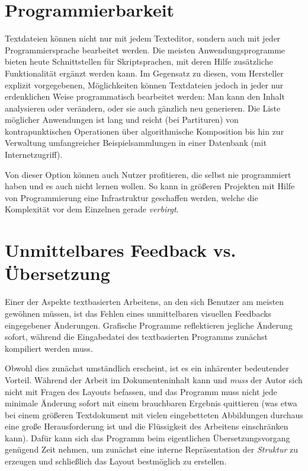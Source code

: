 \documentclass[DIV=12]{scrreprt}
\begin{document}
\section*{Programmierbarkeit}
\label{sec:pt_programmability}
Textdateien können nicht nur mit jedem Texteditor, sondern auch mit jeder Programmiersprache bearbeitet werden.
Die meisten Anwendungsprogramme bieten heute Schnittstellen für Skriptsprachen, mit deren Hilfe zusätzliche Funktionalität ergänzt werden kann.
Im Gegensatz zu diesen, vom Hersteller explizit vorgegebenen, Möglichkeiten können Textdateien jedoch in jeder nur erdenklichen Weise programmatisch bearbeitet werden: Man kann den Inhalt analysieren oder verändern, oder sie auch gänzlich neu generieren.
Die Liste möglicher Anwendungen ist lang und reicht (bei Partituren) von kontrapunktischen Operationen über algorithmische Komposition bis hin zur Verwaltung umfangreicher Beispielsammlungen in einer Datenbank (mit Internetzugriff).

Von dieser Option können auch Nutzer profitieren, die selbst nie programmiert haben und es auch nicht lernen wollen.
So kann in größeren Projekten mit Hilfe von Programmierung eine Infrastruktur geschaffen werden, welche die Komplexität vor dem Einzelnen gerade \emph{verbirgt}.

\section*{Unmittelbares Feedback vs. Übersetzung}
\label{sec:pt_compiling-instant}
Einer der Aspekte textbasierten Arbeitens, an den sich Benutzer am meisten gewöhnen müssen, ist das Fehlen eines unmittelbaren visuellen Feedbacks eingegebener Änderungen.
Grafische Programme reflektieren jegliche Änderung sofort, während die Eingabedatei des textbasierten Programms zunächst kompiliert werden muss.

Obwohl dies zunächst umständlich erscheint, ist es ein inhärenter bedeutender Vorteil.
Während der Arbeit im Dokumenteninhalt kann und \emph{muss} der Autor sich nicht mit Fragen des Layouts befassen, und das Programm muss nicht jede minimale Änderung sofort mit einem brauchbaren Ergebnis quittieren (was etwa bei einem größeren Textdokument mit vielen eingebetteten Abbildungen durchaus eine große Herausforderung ist und die Flüssigkeit des Arbeitens einschränken kann).
Dafür kann sich das Programm beim eigentlichen Übersetzungsvorgang genügend Zeit nehmen, um zunächst eine interne Repräsentation der \emph{Struktur} zu erzeugen und schließlich das Layout bestmöglich zu erstellen.
\end{document}
